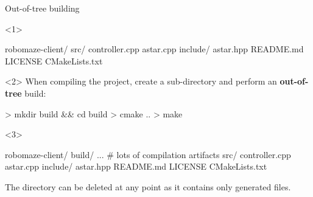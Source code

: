\documentclass[compress]{beamer}
\begin{document}
\begin{frame}[fragile]{Out-of-tree building}

\begin{onlyenv}<1>
\begin{shcode}
robomaze-client/
  src/
    controller.cpp
    astar.cpp
  include/
    astar.hpp
  README.md
  LICENSE
  CMakeLists.txt
\end{shcode}

\end{onlyenv}

\begin{onlyenv}<2>
When compiling the project, create a sub-directory  and perform an
    \textbf{out-of-tree} build:

\begin{shcode}
> mkdir build && cd build
> cmake ..
> make
\end{shcode}

\end{onlyenv}

\begin{onlyenv}<3>

\begin{shcode}
robomaze-client/
  build/
    ... # lots of compilation artifacts
  src/
    controller.cpp
    astar.cpp
  include/
    astar.hpp
  README.md
  LICENSE
  CMakeLists.txt
\end{shcode}

    The  directory can be deleted at any point as it contains only
    generated files.
\end{onlyenv}
\end{frame}
\end{document}

